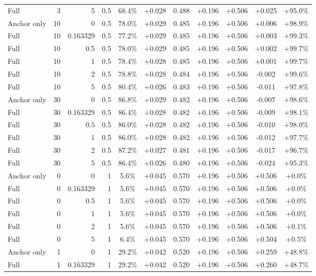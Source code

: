 \begin{table}[htbp]
\begin{tabular}{lrrrccccccc}
Full & 3 & 5 & 0.5 & 68.4\% & +0.028 & 0.488 & +0.196 & +0.506 & +0.025 & +95.0\% \\
Anchor only & 10 & 0 & 0.5 & 78.0\% & +0.029 & 0.485 & +0.196 & +0.506 & +0.006 & +98.9\% \\
Full & 10 & 0.163329 & 0.5 & 77.2\% & +0.029 & 0.485 & +0.196 & +0.506 & +0.003 & +99.3\% \\
Full & 10 & 0.5 & 0.5 & 78.0\% & +0.029 & 0.485 & +0.196 & +0.506 & +0.002 & +99.7\% \\
Full & 10 & 1 & 0.5 & 78.4\% & +0.028 & 0.485 & +0.196 & +0.506 & +0.001 & +99.7\% \\
Full & 10 & 2 & 0.5 & 78.8\% & +0.028 & 0.484 & +0.196 & +0.506 & -0.002 & +99.6\% \\
Full & 10 & 5 & 0.5 & 80.4\% & +0.026 & 0.483 & +0.196 & +0.506 & -0.011 & +97.8\% \\
Anchor only & 30 & 0 & 0.5 & 86.8\% & +0.029 & 0.482 & +0.196 & +0.506 & -0.007 & +98.6\% \\
Full & 30 & 0.163329 & 0.5 & 86.4\% & +0.028 & 0.482 & +0.196 & +0.506 & -0.009 & +98.1\% \\
Full & 30 & 0.5 & 0.5 & 86.0\% & +0.028 & 0.482 & +0.196 & +0.506 & -0.010 & +98.0\% \\
Full & 30 & 1 & 0.5 & 86.0\% & +0.028 & 0.482 & +0.196 & +0.506 & -0.012 & +97.7\% \\
Full & 30 & 2 & 0.5 & 87.2\% & +0.027 & 0.481 & +0.196 & +0.506 & -0.017 & +96.7\% \\
Full & 30 & 5 & 0.5 & 86.4\% & +0.026 & 0.480 & +0.196 & +0.506 & -0.024 & +95.3\% \\
Anchor only & 0 & 0 & 1 & 5.6\% & +0.045 & 0.570 & +0.196 & +0.506 & +0.506 & +0.0\% \\
Full & 0 & 0.163329 & 1 & 5.6\% & +0.045 & 0.570 & +0.196 & +0.506 & +0.506 & +0.0\% \\
Full & 0 & 0.5 & 1 & 5.6\% & +0.045 & 0.570 & +0.196 & +0.506 & +0.506 & +0.0\% \\
Full & 0 & 1 & 1 & 5.6\% & +0.045 & 0.570 & +0.196 & +0.506 & +0.506 & +0.0\% \\
Full & 0 & 2 & 1 & 5.6\% & +0.045 & 0.570 & +0.196 & +0.506 & +0.506 & +0.1\% \\
Full & 0 & 5 & 1 & 6.4\% & +0.045 & 0.570 & +0.196 & +0.506 & +0.504 & +0.5\% \\
Anchor only & 1 & 0 & 1 & 29.2\% & +0.042 & 0.520 & +0.196 & +0.506 & +0.259 & +48.8\% \\
Full & 1 & 0.163329 & 1 & 29.2\% & +0.042 & 0.520 & +0.196 & +0.506 & +0.260 & +48.7\% \\

\end{tabular}
\end{table}
